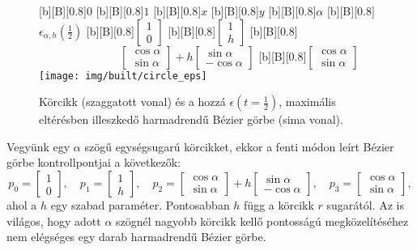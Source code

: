 \documentclass[12pt]{report}
\theoremstyle{definition}
\begin{document}
  \begin{figure}
  [b][B][0.8]{\bf{$0$}}
  [b][B][0.8]{\bf{$1$}}
  [b][B][0.8]{\bf{$x$}}
  [b][B][0.8]{\bf{$y$}}
  [b][B][0.8]{\bf{$\alpha$}}
  [b][B][0.8]{\bf{$\epsilon_{\alpha,h}(\frac{1}{2})$}\qquad}
  [b][B][0.8]{\bf{$\begin{bmatrix} 1 \\ 0 \end{bmatrix}$}}
  [b][B][0.8]{\bf{$\begin{bmatrix} 1 \\ h \end{bmatrix}$}}
  [b][B][0.8]{\bf{$\hspace{3cm}\begin{bmatrix}\cos\alpha\\ \sin\alpha
                              \end{bmatrix} + h \begin{bmatrix} \sin\alpha \\
                              -\cos\alpha \end{bmatrix}$}}
  [b][B][0.8]{\bf{$\begin{bmatrix}\cos\alpha\\ \sin\alpha
                              \end{bmatrix}$}}
    \centering
    \texttt{[image: img/built/circle\_eps]}
    \caption{\label{circle} Körcikk (szaggatott vonal) és a hozzá
    $\epsilon(t=\frac{1}{2})$, maximális eltérésben illeszkedő harmadrendű
    Bézier görbe (sima vonal).}
  \end{figure}

Vegyünk egy $\alpha$ szögű egységsugarú körcikket, ekkor a fenti módon leírt
Bézier görbe kontrollpontjai a következők:
\[p_0 = \begin{bmatrix} 1 \\ 0 \end{bmatrix},\quad
  p_1 = \begin{bmatrix} 1 \\ h \end{bmatrix},\quad
  p_2 = \begin{bmatrix} \cos\alpha \\ \sin\alpha \end{bmatrix} + h
        \begin{bmatrix} \sin\alpha \\ -\cos\alpha \end{bmatrix},\quad
  p_3 = \begin{bmatrix} \cos\alpha \\ \sin\alpha \end{bmatrix}, \]
ahol a $h$ egy szabad paraméter. Pontosabban $h$ függ a körcikk $r$ sugarától.
Az is világos, hogy adott $\alpha$ szögnél nagyobb körcikk kellő pontosságú
megközelítéséhez nem elégséges egy darab harmadrendű Bézier görbe.
\end{document}
